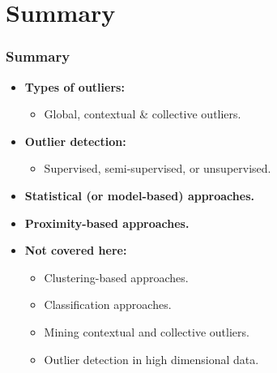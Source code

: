 \section{Summary}

\begin{frame}
	\frametitle{Summary}
	\begin{itemize}
		\item  \textbf{Types of outliers:}
		      \begin{itemize}
			      \item Global, contextual \& collective outliers.
		      \end{itemize}
		\item \textbf{Outlier detection:}
		      \begin{itemize}
			      \item Supervised, semi-supervised, or unsupervised.
		      \end{itemize}
		\item \textbf{Statistical (or model-based) approaches.}
		\item \textbf{Proximity-based approaches.}
		\item \textbf{Not covered here:}
		      \begin{itemize}
			      \item Clustering-based approaches.
			      \item Classification approaches.
			      \item Mining contextual and collective outliers.
			      \item Outlier detection in high dimensional data.
		      \end{itemize}
	\end{itemize}
\end{frame}
